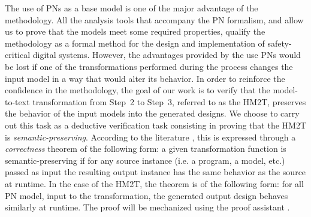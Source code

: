 \documentclass[pdflatex,sn-mathphys]{sn-jnl}%
\theoremstyle{thmstyleone}%
\theoremstyle{thmstyletwo}%
\theoremstyle{thmstylethree}%
\begin{document}

The use of PNs as a base model is one of the major advantage of the
\hilecop{} methodology. All the analysis tools that accompany the PN
formalism, and allow us to prove that the models meet some required
properties, qualify the \hilecop{} methodology as a formal method for
the design and implementation of safety-critical digital
systems. However, the advantages provided by the use PNs would be lost
if one of the transformations performed during the process changes the
input model in a way that would alter its behavior. %
In order to reinforce the confidence in the \hilecop{} methodology,
the goal of our work is to verify that the model-to-text
transformation from Step~2 to Step~3, referred to as the HM2T,
preserves the behavior of the input models into the generated \vhdl{}
designs. We choose to carry out this task as a deductive verification
task consisting in proving that the HM2T is
\textit{semantic-preserving}. According to the literature
\cite{Patrignani2019,Leroy2009}, this is expressed through a
\textit{correctness} theorem of the following form: a given
transformation function is semantic-preserving if for any source
instance (i.e. a program, a model, etc.) passed as input the resulting
output instance has the same behavior as the source at runtime.  In
the case of the HM2T, the theorem is of the following form: for all PN
model, input to the transformation, the generated output \vhdl{}
design behaves similarly at runtime. The proof will be mechanized
using the \coq{} proof assistant \cite{Coq2021}.
\end{document}
